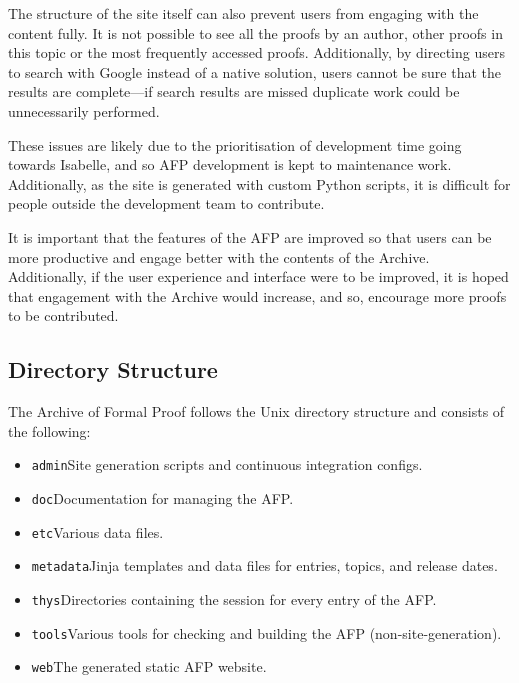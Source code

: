 \documentclass[bsc,frontabs,oneside,singlespacing,parskip,deptreport,logo]{infthesis}
\begin{document}
The structure of the site itself can also prevent users from engaging with the content fully. It is not possible to see all the proofs by an author, other proofs in this topic or the most frequently accessed proofs. Additionally, by directing users to search with Google instead of a native solution, users cannot be sure that the results are complete---if search results are missed duplicate work could be unnecessarily performed.

These issues are likely due to the prioritisation of development time going towards Isabelle, and so AFP development is kept to maintenance work. Additionally, as the site is generated with custom Python scripts, it is difficult for people outside the development team to contribute.

It is important that the features of the AFP are improved so that users can be more productive and engage better with the contents of the Archive. Additionally, if the user experience and interface  were to be improved, it is hoped that engagement with the Archive would increase, and so, encourage more proofs to be contributed.


\subsection{Directory Structure} \label{directory-structure}

The Archive of Formal Proof follows the Unix directory structure and consists of the following:

\begin{itemize}
  \item \texttt{admin}\quad Site generation scripts and continuous integration configs.
  \item \texttt{doc}\quad Documentation for managing the AFP\@.
  \item \texttt{etc}\quad Various data files.
  \item \texttt{metadata}\quad Jinja templates and data files for entries, topics, and release dates.
  \item \texttt{thys}\quad Directories containing the session for every entry of the AFP.
  \item \texttt{tools}\quad Various tools for checking and building the AFP (non-site-generation).
  \item \texttt{web}\quad The generated static AFP website.
\end{itemize}
\end{document}
